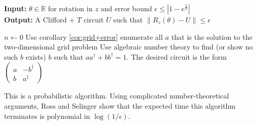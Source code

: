 \begin{algorithm}
	\caption{Approximation of $R_z(\theta)$ using Clifford + $T$ gates}
	\hspace*{\algorithmicindent} \textbf{Input:} $\theta \in \mathbb{R}$ for rotation in $z$ and error bound $\epsilon \leq |1 - e^{\frac{\pi}{8}}|$ \\
\hspace*{\algorithmicindent} \textbf{Output:} A Clifford + $T$ circuit $U$ such that $\|R_z(\theta) - U\| \leq \epsilon$
\begin{algorithmic}[1]
	\State $n \gets 0$ 
	\State Use corollary \ref{cor:grid+error} enumerate all $a$ that is the solution to the two-dimensional grid problem 
	\State Use algebraic number theory to find (or show no such $b$ exists) $b$ such that $aa^\dagger + bb^\dagger = 1$.
	\EndWhile 
	\State The desired circuit is the form $\begin{pmatrix}
	a & -b^\dagger \\
	b & a^\dagger
	\end{pmatrix}$
\end{algorithmic}
\end{algorithm}

This is a probabilistic algorithm.
Using complicated number-theoretical arguments, Ross and Selinger \cite{ross} show that the expected time this algorithm terminates is polynomial in $\log(1/\epsilon)$.

